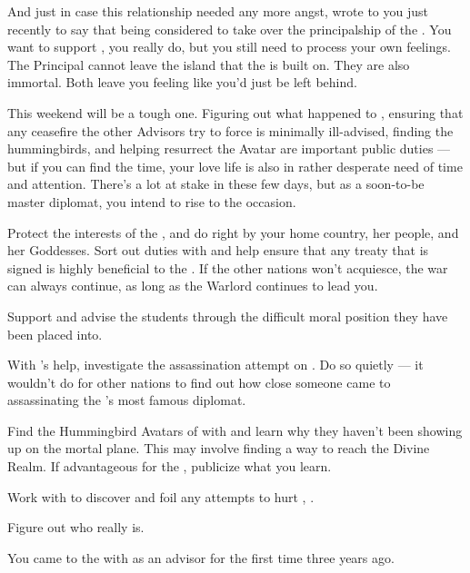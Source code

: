 \documentclass[char]{GL2020}
\begin{document}
And just in case this relationship needed any more angst, \cBeetle{} wrote to you just recently to say that \cBeetle{\theyare} being considered to take over the principalship of the \pSc{}. You want to support \cBeetle{\them}, you really do, but you still need to process your own feelings. The Principal cannot leave the island that the \pSc{} is built on. They are also immortal. Both leave you feeling like you’d just be left behind.

This weekend will be a tough one. Figuring out what happened to \cHeadDiplomat{}, ensuring that any ceasefire the other Advisors try to force is minimally ill-advised, finding the hummingbirds, and helping resurrect the \cEbb{} Avatar are important public duties — but if you can find the time, your love life is also in rather desperate need of time and attention. There's a lot at stake in these few days, but as a soon-to-be master diplomat, you intend to rise to the occasion.

\begin{itemz}
    \item Protect the interests of the \pShip{}, and do right by your home country, her people, and her Goddesses. Sort out duties with \cEbbPriest{} and help ensure that any treaty that is signed is highly beneficial to the \pShippies{}. If the other nations won't acquiesce, the war can always continue, as long as the Warlord continues to lead you.
    \item Support and advise the \pShip{} students through the difficult moral position they have been placed into. 
    \item With \cPresident{}'s help, investigate the assassination attempt on \cHeadDiplomat{}. Do so quietly — it wouldn't do for other nations to find out how close someone came to assassinating the \pShip{}'s most famous diplomat.
    \item Find the Hummingbird Avatars of \cFarmGod{} with \cDisney{} and learn why they haven’t been showing up on the mortal plane. This may involve finding a way to reach the Divine Realm. If advantageous for the \pShip{}, publicize what you learn. 
    \item Work with \cWarlordDaughter{} to discover and foil any attempts to hurt \cWarlordDaughter{\their} \cLoud{\parent}, \cLoud{}.
    \item Figure out who \cBunker{} really is. 
\end{itemz}

\begin{itemz}[Notes]
    \item You came to the \pSchool{} with \cHeadDiplomat{} as an advisor for the first time three years ago.
\end{itemz}
\end{document}
